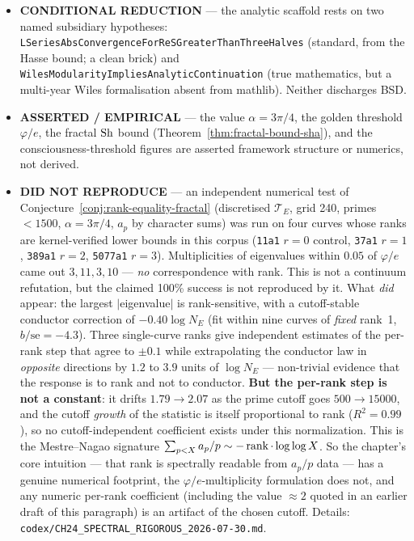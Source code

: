 \begin{itemize}
\item \textbf{CONDITIONAL REDUCTION} --- the analytic scaffold rests on two named subsidiary hypotheses: \texttt{LSeriesAbsConvergenceForReSGreaterThanThreeHalves} (standard, from the Hasse bound; a clean brick) and \texttt{WilesModularityImpliesAnalyticContinuation} (true mathematics, but a multi-year Wiles formalisation absent from mathlib). Neither discharges BSD.
\item \textbf{ASSERTED / EMPIRICAL} --- the value $\alpha=3\pi/4$, the golden threshold $\varphi/e$, the fractal $\mathrm{Sh}$ bound (Theorem~\ref{thm:fractal-bound-sha}), and the consciousness-threshold figures are asserted framework structure or numerics, not derived.
\item \textbf{DID NOT REPRODUCE} --- an independent numerical test of
Conjecture~\ref{conj:rank-equality-fractal} (discretised $\mathcal{T}_E$,
grid 240, primes $<1500$, $\alpha=3\pi/4$, $a_p$ by character sums) was run on
four curves whose ranks are kernel-verified lower bounds in this corpus
(\texttt{11a1} $r{=}0$ control, \texttt{37a1} $r{=}1$, \texttt{389a1} $r{=}2$,
\texttt{5077a1} $r{=}3$).  Multiplicities of eigenvalues within $0.05$ of
$\varphi/e$ came out $3, 11, 3, 10$ --- \emph{no} correspondence with rank.
This is not a continuum refutation, but the claimed 100\% success is not
reproduced by it.  What \emph{did} appear: the largest
$|$eigenvalue$|$ is rank-sensitive, with a cutoff-stable conductor correction
of $-0.40\log N_E$ (fit within nine curves of \emph{fixed} rank~1, $b/\mathrm{se}
= -4.3$).  Three single-curve ranks give independent estimates of the per-rank
step that agree to $\pm 0.1$ while extrapolating the conductor law in
\emph{opposite} directions by $1.2$ to $3.9$ units of $\log N_E$ --- non-trivial
evidence that the response is to rank and not to conductor.  \textbf{But the
per-rank step is not a constant}: it drifts $1.79 \to 2.07$ as the prime cutoff
goes $500 \to 15000$, and the cutoff \emph{growth} of the statistic is itself
proportional to rank ($R^2 = 0.99$), so no cutoff-independent coefficient
exists under this normalization.  This is the Mestre--Nagao signature
$\sum_{p<X} a_p/p \sim -\operatorname{rank} \cdot \log\log X$.  So the chapter's core
intuition --- that rank is spectrally readable from $a_p/p$ data --- has a
genuine numerical footprint, the $\varphi/e$-multiplicity formulation does not,
and any numeric per-rank coefficient (including the value $\approx 2$ quoted in
an earlier draft of this paragraph) is an artifact of the chosen cutoff.
Details: \texttt{codex/CH24\_SPECTRAL\_RIGOROUS\_2026-07-30.md}.
\end{itemize}

